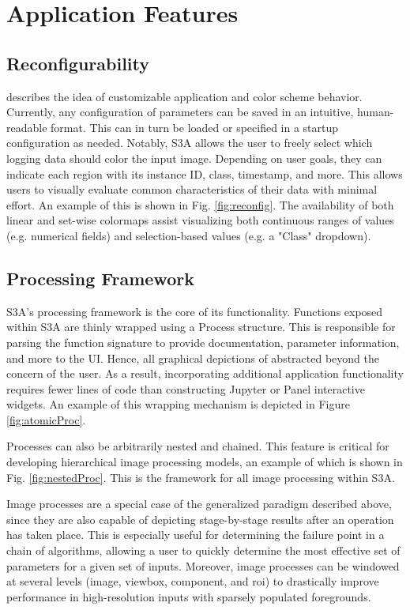 \section{Application Features}
\subsection{Reconfigurability}
\cite{jessurunComponentDetectionEvaluation2020} describes the idea of customizable application and color scheme behavior. Currently, any configuration of parameters can be saved in an intuitive, human-readable format. This can in turn be loaded or specified in a startup configuration as needed. Notably, S3A allows the user to freely select which logging data should color the input image. Depending on user goals, they can indicate each region with its instance ID, class, timestamp, and more. This allows users to visually evaluate common characteristics of their data with minimal effort. An example of this is shown in Fig. \ref{fig:reconfig}. The availability of both linear and set-wise colormaps assist visualizing both continuous ranges of values (e.g. numerical fields) and selection-based values (e.g. a "Class" dropdown).

\makeReconfigFigs

\subsection{Processing Framework}\label{sec:procFramework}
S3A's processing framework is the core of its functionality. Functions exposed within S3A are thinly wrapped using a Process structure. This is responsible for parsing the function signature to provide documentation, parameter information, and more to the UI. Hence, all graphical depictions of abstracted beyond the concern of the user. As a result, incorporating additional application functionality requires fewer lines of code than constructing Jupyter or Panel interactive widgets. An example of this wrapping mechanism is depicted in Figure \ref{fig:atomicProc}.

\makeAtomicProcFig

Processes can also be arbitrarily nested and chained. This feature is critical for developing hierarchical image processing models, an example of which is shown in Fig. \ref{fig:nestedProc}. This is the framework for all image processing within S3A.

\makeNestedProcFig

Image processes are a special case of the generalized paradigm described above, since they are also capable of depicting stage-by-stage results after an operation has taken place. This is especially useful for determining the failure point in a chain of algorithms, allowing a user to quickly determine the most effective set of parameters for a given set of inputs. Moreover, image processes can be windowed at several levels (image, viewbox, component, and roi) to drastically improve performance in high-resolution inputs with sparsely populated foregrounds.

